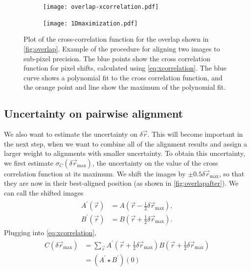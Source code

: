 \documentclass{article}
\begin{document}
\begin{figure}[ht]
	\centering
	\begin{subfigure}{0.45\linewidth}
	\texttt{[image: overlap-xcorrelation.pdf]}
	\caption{}
	\label{fig:xcorrelation}
	\end{subfigure}
	\begin{subfigure}{0.45\linewidth}
	\texttt{[image: 1Dmaximization.pdf]}
	\caption{}
	\label{fig:1Dmaximizationplot}
	\end{subfigure}
	\caption{
		 Plot of the cross-correlation function for the overlap shown in \cref{fig:overlap}.
		 Example of the procedure for aligning two images to sub-pixel precision.  The blue points show the cross correlation function for pixel shifts, calculated using \cref{eq:xcorrelation}.  The blue curve shows a polynomial fit to the cross correlation function, and the orange point and line show the maximum of the polynomial fit.
	}
	\label{fig:1Dmaximization}
\end{figure}

\subsection{Uncertainty on pairwise alignment}

We also want to estimate the uncertainty on $\delta\vec{r}$.  This will become important in the next step, when we want to combine all of the alignment results and assign a larger weight to alignments with smaller uncertainty.  To obtain this uncertainty, we first estimate $\sigma_C(\delta\vec{r}_\text{max})$, the uncertainty on the value of the cross correlation function at its maximum.  We shift the images by $\pm0.5\delta\vec{r}_\text{max}$, so that they are now in their best-aligned position (as shown in \cref{fig:overlapafter}).  We can call the shifted images
\begin{align}
\begin{aligned}
A^\prime(\vec{r})&=A\left(\vec{r}-\frac{1}{2}\delta\vec{r}_\text{max}\right), \\
B^\prime(\vec{r})&=B\left(\vec{r}+\frac{1}{2}\delta\vec{r}_\text{max}\right).
\end{aligned}
\end{align}
Plugging into \cref{eq:xcorrelation},
\begin{align}
\begin{aligned}
C(\delta\vec{r}_\text{max})&=\sum_{\vec{r}}A^\prime\left(\vec{r}+\frac{1}{2}\delta\vec{r}_\text{max}\right) B\left(\vec{r}+\frac{1}{2}\delta\vec{r}_\text{max}\right) \\
&=(A^\prime\star B^\prime)(0)
\end{aligned}
\end{align}
\end{document}
